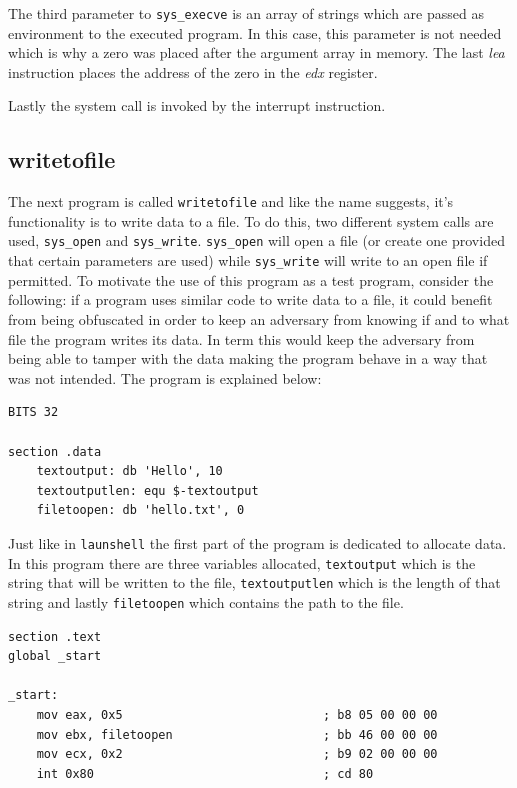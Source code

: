 \documentclass[11pt,twoside]{eitExjobb}
\begin{document}
The third parameter to \texttt{sys\_execve} is an array of strings which are passed as environment to the executed program. In this case, this parameter is not needed which is why a zero was placed after the argument array in memory. The last \emph{lea} instruction places the address of the zero in the \emph{edx} register.

Lastly the system call is invoked by the interrupt instruction.



\subsection{writetofile}
The next program is called \texttt{writetofile} and like the name suggests, it's functionality is to write data to a file. To do this, two different system calls are used, \texttt{sys\_open} and \texttt{sys\_write}. \texttt{sys\_open} will open a file (or create one provided that certain parameters are used) while \texttt{sys\_write} will write to an open file if permitted. To motivate the use of this program as a test program, consider the following: if a program uses similar code to write data to a file, it could benefit from being obfuscated in order to keep an adversary from knowing if and to what file the program writes its data. In term this would keep the adversary from being able to tamper with the data making the program behave in a way that was not intended. The program is explained below:

\begin{verbatim}
BITS 32

section .data
    textoutput: db 'Hello', 10
    textoutputlen: equ $-textoutput
    filetoopen: db 'hello.txt', 0
\end{verbatim}

\noindent Just like in \texttt{launshell} the first part of the program is dedicated to allocate data. In this program there are three variables allocated, \texttt{textoutput} which is the string that will be written to the file, \texttt{textoutputlen} which is the length of that string and lastly \texttt{filetoopen} which contains the path to the file.

\begin{verbatim}
section .text
global _start

_start:
    mov eax, 0x5                            ; b8 05 00 00 00
    mov ebx, filetoopen                     ; bb 46 00 00 00
    mov ecx, 0x2                            ; b9 02 00 00 00
    int 0x80                                ; cd 80
\end{verbatim}
\end{document}
